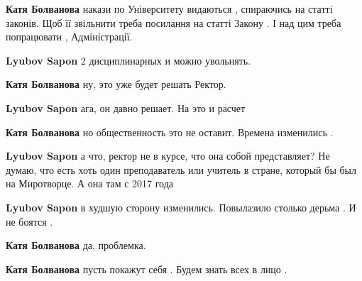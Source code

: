 \begin{itemize}
\begin{itemize}
\textbf{Катя Болванова} накази по Університету видаються , спираючись на статті
законів. Щоб її звільнити треба посилання на статті Закону . І над цим треба
попрацювати , Адміністрації.


\textbf{Lyubov Sapon} 2 дисциплинарных и можно увольнять.


\textbf{Катя Болванова} ну, это уже будет решать Ректор.


\textbf{Lyubov Sapon} ага, он давно решает. На это и расчет


\textbf{Катя Болванова} но общественность это не оставит. Времена изменились .


\textbf{Lyubov Sapon} а что, ректор не в курсе, что она собой представляет? Не
думаю, что есть хоть один преподаватель или учитель в стране, который бы был на
Миротворце. А она там с 2017 года


\textbf{Lyubov Sapon} в худшую сторону изменились. Повылазило столько дерьма . И не боятся .


\textbf{Катя Болванова} да, проблемка.


\textbf{Катя Болванова} пусть покажут себя . Будем знать всех в лицо .



\end{itemize}
\end{itemize}
